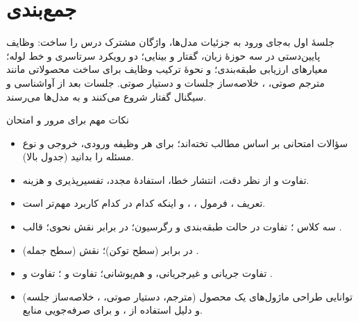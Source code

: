 \section{جمع‌بندی}
جلسهٔ اول به‌جای ورود به جزئیات مدل‌ها، واژگان مشترک درس را ساخت: وظایف پایین‌دستی در سه حوزهٔ زبان، گفتار و بینایی؛ دو رویکرد سرتاسری و خط لوله؛ معیارهای ارزیابی طبقه‌بندی؛ و نحوهٔ ترکیب وظایف برای ساخت محصولاتی مانند مترجم صوتی، ، خلاصه‌ساز جلسات و دستیار صوتی. جلسات بعد از آواشناسی و سیگنال گفتار شروع می‌کنند و به مدل‌ها می‌رسند.

\begin{exambox}{نکات مهم برای مرور و امتحان}
\begin{itemize}
  \item سؤالات امتحانی بر اساس مطالب تخته‌اند؛ برای هر وظیفه ورودی، خروجی و نوع مسئله را بدانید (جدول بالا).
  \item تفاوت  و  از نظر دقت، انتشار خطا، استفادهٔ مجدد، تفسیرپذیری و هزینه.
  \item تعریف ، فرمول ، ،  و اینکه کدام در کدام کاربرد مهم‌تر است.
  \item سه کلاس ؛ تفاوت  در حالت طبقه‌بندی و رگرسیون؛  در برابر نقش نحوی؛ قالب .
  \item {} (سطح جمله) در برابر  (سطح توکن)؛ نقش .
  \item تفاوت جریانی و غیرجریانی،  و هم‌پوشانی؛ تفاوت  و ؛ تفاوت  و .
  \item توانایی طراحی ماژول‌های یک محصول (مترجم، دستیار صوتی، ، خلاصه‌ساز جلسه) و دلیل استفاده از ،  و  برای صرفه‌جویی منابع.
\end{itemize}
\end{exambox}

